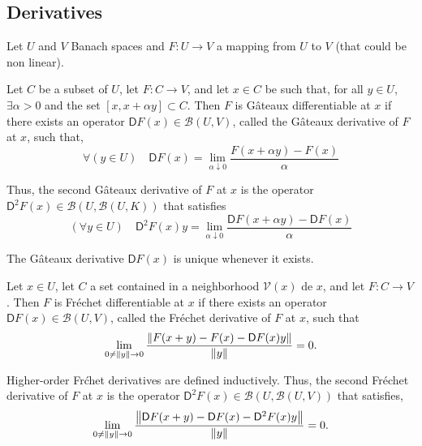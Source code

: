 \subsection{Derivatives}
Let $U$ and $V$ Banach spaces and $F:U\rightarrow V$ a mapping from $U$ to $V$ (that could be non linear).
\begin{definition}
	Let $C$ be a subset of $U$, let $F: C \rightarrow V$, and let $x \in C$
	be such that, for all $y \in U$, $\exists \alpha >0$ and the set $[x, x + \alpha y] \subset C$. Then $F$ is G\^ateaux
	differentiable at $x$ if there exists an operator $\mathsf{D}F(x) \in \mathcal{B}(U, V)$, called the G\^ateaux derivative of $F$ at $x$, such that,
	\[
	\forall (y \in U)\quad \mathsf{D}F(x) = \lim\limits_{\alpha \downarrow 0} \frac{F(x+\alpha y)-F(x)}{\alpha}
	\]
	
	 Thus, the second G\^ateaux derivative of $F$ at $x$ is the operator $\mathsf{D}^2 F(x) \in \mathcal{B}(U, \mathcal{B}(U, K))$ that
	 satisfies \[(\forall y \in  U) \quad \mathsf{D}^2 F(x) y = \lim\limits_{\alpha \downarrow 0} \frac{\mathsf{D}F(x + \alpha y) - \mathsf{D}F(x)}{\alpha} 
	 \]
\end{definition}
 
\begin{remark}
	The G\^ateaux derivative $\mathsf{D}F(x)$ is unique whenever it exists.	
\end{remark}

\begin{definition}
	Let $x \in U$, let $C$ a set contained  in a neighborhood $\mathcal{V}(x)$ de $x$, and let $F : C \rightarrow V$. Then $F$ is
	Fr\'echet differentiable at $x$ if there exists an operator $\mathsf{D}F(x)\in \mathcal{B}(U, V)$, called the Fr\'echet derivative of $F$ at $x$, such that
	\[
	\lim_{0\neq\left\lVert y\right\rVert\rightarrow 0}\frac{\left\lVert F(x+y)-F(x)-\mathsf{D}F(x)y\right\rVert}{\left\lVert y\right\rVert}=0.
	\]
	
	Higher-order Fr\'chet derivatives are defined inductively. Thus, the second Fr\'echet derivative of $F$ at $x$ is the operator $\mathsf{D}^2 F(x) \in  \mathcal{B}(U, \mathcal{B}(U, V))$ that satisfies,
	\[
		\lim_{0\neq\left\lVert y\right\rVert\rightarrow 0}\frac{\left\lVert\mathsf{D}F(x+y)-\mathsf{D}F(x)-\mathsf{D}^2F(x)y\right\rVert}{\left\lVert y\right\rVert}=0.
	\]
	\label{def1. Frechet.}
\end{definition}



